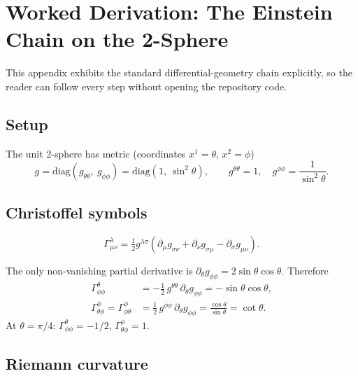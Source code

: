 \documentclass[11pt,twoside]{book}
\begin{document}

\chapter{Worked Derivation: The Einstein Chain on the 2-Sphere}
\label{app:worked}

This appendix exhibits the standard differential-geometry chain explicitly, so the reader
can follow every step without opening the repository code.

\section{Setup}

The unit 2-sphere has metric (coordinates $x^1=\theta$, $x^2=\phi$)
\begin{equation}
g = \mathrm{diag}\!\left(g_{\theta\theta},\ g_{\phi\phi}\right)
  = \mathrm{diag}\!\left(1,\ \sin^2\theta\right),
\qquad g^{\theta\theta}=1,\quad g^{\phi\phi}=\frac{1}{\sin^2\theta}.
\end{equation}

\section{Christoffel symbols}

\begin{equation}
\Gamma^\lambda_{\mu\nu} = \tfrac12 g^{\lambda\sigma}\left(
\partial_\mu g_{\sigma\nu} + \partial_\nu g_{\sigma\mu} - \partial_\sigma g_{\mu\nu}\right).
\end{equation}

The only non-vanishing partial derivative is
$\partial_\theta g_{\phi\phi} = 2\sin\theta\cos\theta$. Therefore
\begin{align}
\Gamma^\theta_{\phi\phi} &= -\tfrac12\, g^{\theta\theta}\, \partial_\theta g_{\phi\phi}
= -\sin\theta\cos\theta, \\
\Gamma^\phi_{\theta\phi} = \Gamma^\phi_{\phi\theta}
&= \tfrac12\, g^{\phi\phi}\, \partial_\theta g_{\phi\phi}
= \frac{\cos\theta}{\sin\theta} = \cot\theta.
\end{align}
At $\theta=\pi/4$: $\Gamma^\theta_{\phi\phi}=-1/2$, $\Gamma^\phi_{\theta\phi}=1$.

\section{Riemann curvature}
\end{document}
